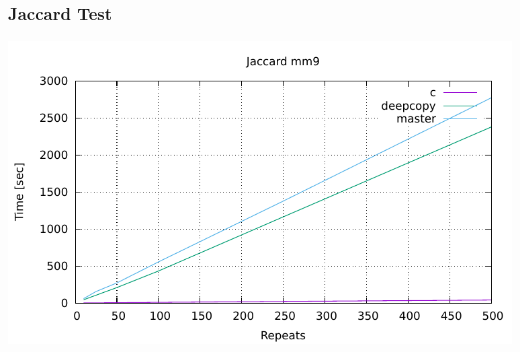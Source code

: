 \begin{frame}[plain]
	\frametitle{Jaccard Test}
	\begin{center}
		\includegraphics[width=1.0\textwidth]{img/jaccard-mm9}
	\end{center}
\end{frame}